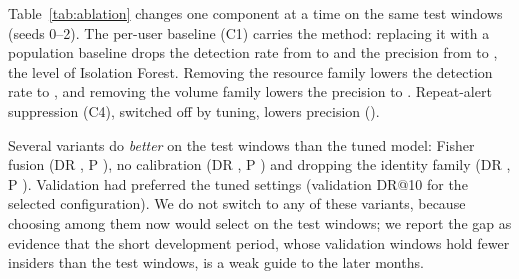 Table~\ref{tab:ablation} changes one component at a time on the same test windows (seeds 0--2).
The per-user baseline (C1) carries the method: replacing it with a population baseline drops the
detection rate from \AblFullDR{} to \AblNoCOneDR{} and the precision from \AblFullP{} to
\AblNoCOneP{}, the level of Isolation Forest. Removing the resource family lowers the detection rate
to \AblNoResourceDR{}, and removing the volume family lowers the precision to \AblNoVolumeP{}.
Repeat-alert suppression (C4), switched off by tuning, lowers precision (\AblCFourP).

Several variants do \emph{better} on the test windows than the tuned model: Fisher fusion
(DR \AblFisherDR, P \AblFisherP), no calibration (DR \AblNoCTwoDR, P \AblNoCTwoP) and dropping the
identity family (DR \AblNoIdentityDR, P \AblNoIdentityP). Validation had preferred the tuned
settings (validation DR@10 \ValDROurs{} for the selected configuration). We do not switch to any of
these variants, because choosing among them now would select on the test windows; we report the gap
as evidence that the short development period, whose validation windows hold fewer insiders than
the test windows, is a weak guide to the later months.

\begin{table}[t]
\centering
\caption{Ablation at 10 alerts/day on the test windows (DR with 95\% CI over insiders; P@10).}
\label{tab:ablation}
\end{table}
